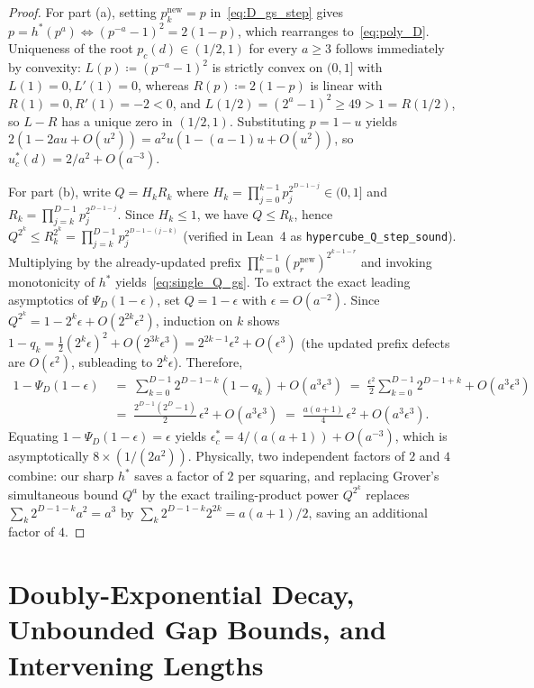 \documentclass[11pt,a4paper]{article}
\theoremstyle{definition}
\begin{document}
\begin{proof}
For part (a), setting $p_k^{\mathrm{new}} = p$ in~\eqref{eq:D_gs_step} gives $p = h^*(p^a) \iff (p^{-a}-1)^2 = 2(1-p)$, which rearranges to~\eqref{eq:poly_D}. Uniqueness of the root $p_c(d) \in (1/2, 1)$ for every $a \ge 3$ follows immediately by convexity: $L(p) \coloneqq (p^{-a}-1)^2$ is strictly convex on $(0,1]$ with $L(1)=0, L'(1)=0$, whereas $R(p) \coloneqq 2(1-p)$ is linear with $R(1)=0, R'(1)=-2 < 0$, and $L(1/2) = (2^a - 1)^2 \ge 49 > 1 = R(1/2)$, so $L - R$ has a unique zero in $(1/2,1)$. Substituting $p = 1 - u$ yields $2(1-2au + O(u^2)) = a^2 u(1 - (a-1)u + O(u^2))$, so $u_c^*(d) = 2/a^2 + O(a^{-3})$.

For part (b), write $Q = H_k R_k$ where $H_k = \prod_{j=0}^{k-1} p_j^{2^{D-1-j}} \in (0,1]$ and $R_k = \prod_{j=k}^{D-1} p_j^{2^{D-1-j}}$. Since $H_k \le 1$, we have $Q \le R_k$, hence $Q^{2^k} \le R_k^{2^k} = \prod_{j=k}^{D-1} p_j^{2^{D-1-(j-k)}}$ (verified in Lean~4 as \texttt{hypercube\_Q\_step\_sound}). Multiplying by the already-updated prefix $\prod_{r=0}^{k-1} (p_r^{\mathrm{new}})^{2^{k-1-r}}$ and invoking monotonicity of $h^*$ yields~\eqref{eq:single_Q_gs}. To extract the exact leading asymptotics of $\Psi_D(1-\epsilon)$, set $Q = 1 - \epsilon$ with $\epsilon = O(a^{-2})$. Since $Q^{2^k} = 1 - 2^k \epsilon + O(2^{2k}\epsilon^2)$, induction on $k$ shows $1 - q_k = \frac{1}{2}(2^k \epsilon)^2 + O(2^{3k}\epsilon^3) = 2^{2k-1}\epsilon^2 + O(\epsilon^3)$ (the updated prefix defects are $O(\epsilon^2)$, subleading to $2^k\epsilon$). Therefore,
\begin{align*}
  1 - \Psi_D(1 - \epsilon)
  &\;=\; \sum_{k=0}^{D-1} 2^{D-1-k}(1 - q_k) + O(a^3\epsilon^3)
   \;=\; \frac{\epsilon^2}{2} \sum_{k=0}^{D-1} 2^{D-1+k} + O(a^3\epsilon^3) \\
  &\;=\; \frac{2^{D-1}(2^D - 1)}{2}\,\epsilon^2 + O(a^3\epsilon^3)
   \;=\; \frac{a(a+1)}{4}\,\epsilon^2 + O(a^3\epsilon^3).
\end{align*}
Equating $1 - \Psi_D(1-\epsilon) = \epsilon$ yields $\epsilon_c^* = 4/(a(a+1)) + O(a^{-3})$, which is asymptotically $8 \times (1/(2a^2))$. Physically, two independent factors of $2$ and $4$ combine: our sharp $h^*$ saves a factor of $2$ per squaring, and replacing Grover's simultaneous bound $Q^a$ by the exact trailing-product power $Q^{2^k}$ replaces $\sum_k 2^{D-1-k} a^2 = a^3$ by $\sum_k 2^{D-1-k} 2^{2k} = a(a+1)/2$, saving an additional factor of $4$.
\end{proof}

\section{Doubly-Exponential Decay, Unbounded Gap Bounds, and Intervening Lengths}
\label{sec:asymptotic}
\end{document}
